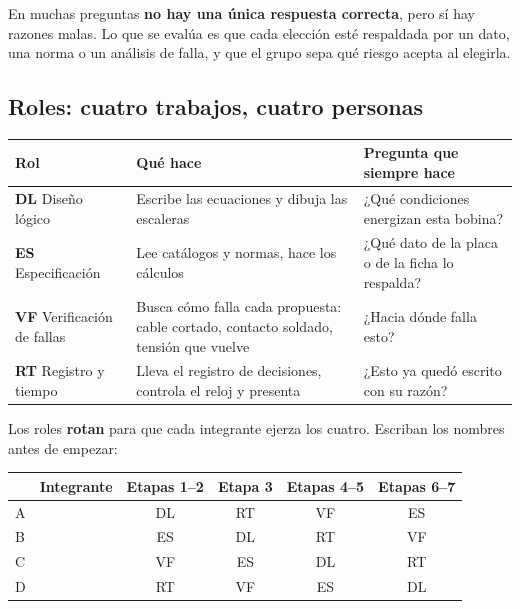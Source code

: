 \documentclass[11pt,a4paper]{article}
\begin{document}
En muchas preguntas \textbf{no hay una única respuesta correcta}, pero sí hay razones malas. Lo que se evalúa es que cada elección esté respaldada por un dato, una norma o un análisis de falla, y que el grupo sepa qué riesgo acepta al elegirla.

\subsection*{Roles: cuatro trabajos, cuatro personas}

\begin{center}\small\renewcommand{\arraystretch}{1.25}
\begin{tabularx}{\linewidth}{@{}l L L@{}}
\toprule
\textbf{Rol} & \textbf{Qué hace} & \textbf{Pregunta que siempre hace}\\
\midrule
\textbf{DL} Diseño lógico & Escribe las ecuaciones y dibuja las escaleras & ¿Qué condiciones energizan esta bobina?\\
\textbf{ES} Especificación & Lee catálogos y normas, hace los cálculos & ¿Qué dato de la placa o de la ficha lo respalda?\\
\textbf{VF} Verificación de fallas & Busca cómo falla cada propuesta: cable cortado, contacto soldado, tensión que vuelve & ¿Hacia dónde falla esto?\\
\textbf{RT} Registro y tiempo & Lleva el registro de decisiones, controla el reloj y presenta & ¿Esto ya quedó escrito con su razón?\\
\bottomrule
\end{tabularx}
\end{center}

Los roles \textbf{rotan} para que cada integrante ejerza los cuatro. Escriban los nombres antes de empezar:

\begin{center}\small\renewcommand{\arraystretch}{1.35}
\begin{tabularx}{\linewidth}{@{}l L c c c c@{}}
\toprule
& \textbf{Integrante} & \textbf{Etapas 1--2} & \textbf{Etapa 3} & \textbf{Etapas 4--5} & \textbf{Etapas 6--7}\\
\midrule
A & & DL & RT & VF & ES\\
B & & ES & DL & RT & VF\\
C & & VF & ES & DL & RT\\
D & & RT & VF & ES & DL\\
\bottomrule
\end{tabularx}
\end{center}
\end{document}
